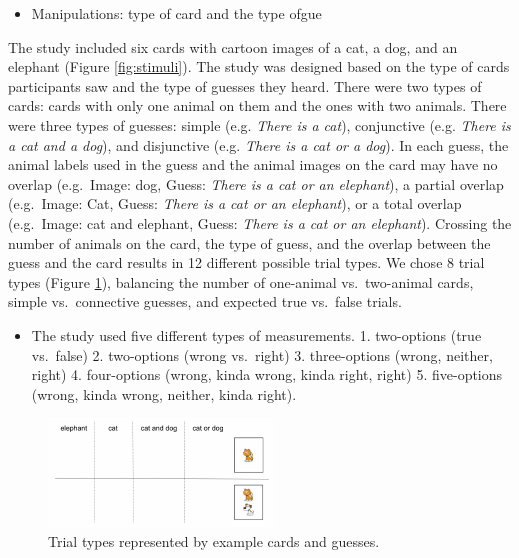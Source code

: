 \documentclass[man]{apa6}
\providecommand{\tightlist}{%
  \setlength{\itemsep}{0pt}\setlength{\parskip}{0pt}}
\theoremstyle{definition}
\theoremstyle{definition}
\theoremstyle{definition}
\theoremstyle{remark}
\begin{document}
\begin{itemize}
\tightlist
\item
  Manipulations: type of card and the type ofgue
\end{itemize}

The study included six cards with cartoon images of a cat, a dog, and an
elephant (Figure \ref{fig:stimuli}). The study was designed based on the
type of cards participants saw and the type of guesses they heard. There
were two types of cards: cards with only one animal on them and the ones
with two animals. There were three types of guesses: simple (e.g.
\emph{There is a cat}), conjunctive (e.g. \emph{There is a cat and a
dog}), and disjunctive (e.g. \emph{There is a cat or a dog}). In each
guess, the animal labels used in the guess and the animal images on the
card may have no overlap (e.g.~Image: dog, Guess: \emph{There is a cat
or an elephant}), a partial overlap (e.g.~Image: Cat, Guess: \emph{There
is a cat or an elephant}), or a total overlap (e.g.~Image: cat and
elephant, Guess: \emph{There is a cat or an elephant}). Crossing the
number of animals on the card, the type of guess, and the overlap
between the guess and the card results in 12 different possible trial
types. We chose 8 trial types (Figure \ref{fig:trials}), balancing the
number of one-animal vs.~two-animal cards, simple vs.~connective
guesses, and expected true vs.~false trials.

\begin{itemize}
\tightlist
\item
  The study used five different types of measurements. 1. two-options
  (true vs.~false) 2. two-options (wrong vs.~right) 3. three-options
  (wrong, neither, right) 4. four-options (wrong, kinda wrong, kinda
  right, right) 5. five-options (wrong, kinda wrong, neither, kinda
  right).
\end{itemize}

\begin{figure}[t]

{\centering \includegraphics{writeup_files/figure-latex/trials-1} 

}

\caption{Trial types represented by example cards and guesses.}\label{fig:trials}
\end{figure}
\end{document}
